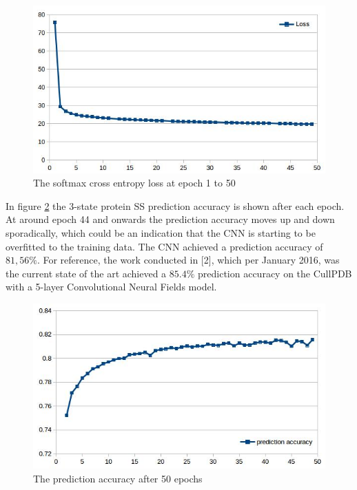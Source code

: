 \documentclass{article}
\begin{document}
\begin{figure}[t]
\centering
\includegraphics[width=.75\linewidth]{img/loss.jpg}
\caption{The softmax cross entropy loss at epoch 1 to 50}
\label{fig:loss}
\end{figure}

In figure \ref{fig:accuracy} the 3-state protein SS prediction accuracy is shown after each epoch. At around epoch 44 and onwards the prediction accuracy moves up and down sporadically, which could be an indication that the CNN is starting to be overfitted to the training data. The CNN achieved a prediction accuracy of $81,56\%$. For reference, the work conducted in [2], which per January 2016, was the current state of the art achieved a $85.4\%$ prediction accuracy on the CullPDB with a 5-layer Convolutional Neural Fields model.    

\begin{figure}[t]
\centering
\includegraphics[width=.75\linewidth]{img/prediction-accuracy.jpg}
\caption{The prediction accuracy after 50 epochs}
\label{fig:accuracy}
\end{figure}
  
\end{document}
